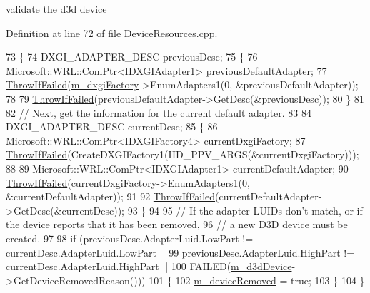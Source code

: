 validate the d3d device 



Definition at line 72 of file Device\+Resources.\+cpp.


\begin{DoxyCode}
73 \{
74     DXGI\_ADAPTER\_DESC previousDesc;
75     \{
76         Microsoft::WRL::ComPtr<IDXGIAdapter1> previousDefaultAdapter;
77         \mbox{\hyperlink{_direct_x_helper_8h_abca3eeca6b5772a1112e0a9a9e3d9013}{ThrowIfFailed}}(\mbox{\hyperlink{class_d_x_1_1_device_resources_ab644f438ae69bde6c40c147dbda95928}{m\_dxgiFactory}}->EnumAdapters1(0, &previousDefaultAdapter));
78 
79         \mbox{\hyperlink{_direct_x_helper_8h_abca3eeca6b5772a1112e0a9a9e3d9013}{ThrowIfFailed}}(previousDefaultAdapter->GetDesc(&previousDesc));
80     \}
81 
82     \textcolor{comment}{// Next, get the information for the current default adapter.}
83 
84     DXGI\_ADAPTER\_DESC currentDesc;
85     \{
86         Microsoft::WRL::ComPtr<IDXGIFactory4> currentDxgiFactory;
87         \mbox{\hyperlink{_direct_x_helper_8h_abca3eeca6b5772a1112e0a9a9e3d9013}{ThrowIfFailed}}(CreateDXGIFactory1(IID\_PPV\_ARGS(&currentDxgiFactory)));
88 
89         Microsoft::WRL::ComPtr<IDXGIAdapter1> currentDefaultAdapter;
90         \mbox{\hyperlink{_direct_x_helper_8h_abca3eeca6b5772a1112e0a9a9e3d9013}{ThrowIfFailed}}(currentDxgiFactory->EnumAdapters1(0, &currentDefaultAdapter));
91 
92         \mbox{\hyperlink{_direct_x_helper_8h_abca3eeca6b5772a1112e0a9a9e3d9013}{ThrowIfFailed}}(currentDefaultAdapter->GetDesc(&currentDesc));
93     \}
94 
95     \textcolor{comment}{// If the adapter LUIDs don't match, or if the device reports that it has been removed,}
96     \textcolor{comment}{// a new D3D device must be created.}
97 
98     \textcolor{keywordflow}{if} (previousDesc.AdapterLuid.LowPart != currentDesc.AdapterLuid.LowPart ||
99         previousDesc.AdapterLuid.HighPart != currentDesc.AdapterLuid.HighPart ||
100         FAILED(\mbox{\hyperlink{class_d_x_1_1_device_resources_ac883ca593d5c03fe20d5865cb033cee1}{m\_d3dDevice}}->GetDeviceRemovedReason()))
101     \{
102         \mbox{\hyperlink{class_d_x_1_1_device_resources_af4d113c651dcae9a344094cfc02a6a09}{m\_deviceRemoved}} = \textcolor{keyword}{true};
103     \}
104 \}
\end{DoxyCode}
\mbox{\label{class_d_x_1_1_device_resources_a53d3cb840dfc40ef2eecfd993740447f}} 
